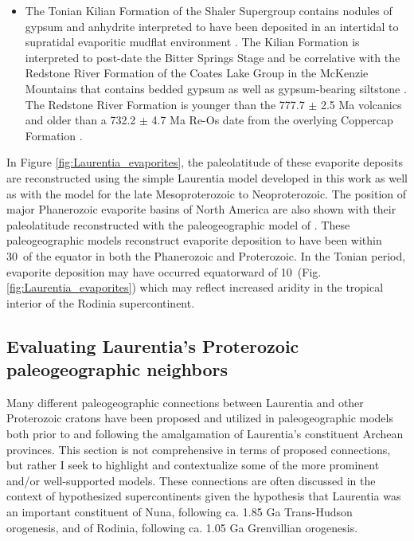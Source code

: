 \documentclass[twocolumn, switch]{article} %
\begin{document}
\begin{itemize}
\item The Tonian Kilian Formation of the Shaler Supergroup contains nodules of gypsum and anhydrite interpreted to have been deposited in an intertidal to supratidal evaporitic mudflat environment \citep{Prince2014a}. The Kilian Formation is interpreted to post-date the Bitter Springs Stage and be correlative with the Redstone River Formation of the Coates Lake Group in the McKenzie Mountains that contains bedded gypsum as well as gypsum-bearing siltstone \citep{Jefferson1989a, Jones2010a}. The Redstone River Formation is younger than the 777.7 $\pm$ 2.5 Ma volcanics and older than a 732.2 $\pm$ 4.7 Ma Re-Os date from the overlying Coppercap Formation \citep{Rooney2014a}.
\end{itemize}

In Figure \ref{fig:Laurentia_evaporites}, the paleolatitude of these evaporite deposits are reconstructed using the simple Laurentia model developed in this work as well as with the \cite{Li2013a} model for the late Mesoproterozoic to Neoproterozoic. The position of major Phanerozoic evaporite basins of North America are also shown with their paleolatitude reconstructed with the paleogeographic model of \cite{Torsvik2017a}. These paleogeographic models reconstruct evaporite deposition to have been within 30\textdegree\ of the equator in both the Phanerozoic and Proterozoic. In the Tonian period, evaporite deposition may have occurred equatorward of 10\textdegree\ (Fig. \ref{fig:Laurentia_evaporites}) which may reflect increased aridity in the tropical interior of the Rodinia supercontinent.

\subsection{Evaluating Laurentia's Proterozoic paleogeographic neighbors}

Many different paleogeographic connections between Laurentia and other Proterozoic cratons have been proposed and utilized in paleogeographic models both prior to and following the amalgamation of Laurentia's constituent Archean provinces. This section is not comprehensive in terms of proposed connections, but rather I seek to highlight and contextualize some of the more prominent and/or well-supported models. These connections are often discussed in the context of hypothesized supercontinents given the hypothesis that Laurentia was an important constituent of Nuna, following ca. 1.85 Ga Trans-Hudson orogenesis, and of Rodinia, following ca. 1.05 Ga Grenvillian orogenesis. 
\end{document}
